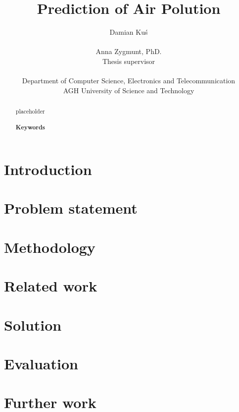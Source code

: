 \documentclass[11pt]{article}
\title{\textbf{	Prediction of Air Polution }}
\author {
	Damian Kuś\\\\
	Anna Zygmunt, PhD.\\
	\small{Thesis supervisor}\\\\
	Department of Computer Science, Electronics and Telecommunication\\
	AGH University of Science and Technology
}
\begin{document}
\maketitle

\begin{abstract}
placeholder
\\
\\
\noindent \large \textbf{Keywords} \\

\end{abstract}


\section{Introduction}


\section{Problem statement}


\section{Methodology}


\section{Related work}


\section{Solution}

\section{Evaluation}


\section{Further work}

{}

\end{document}
